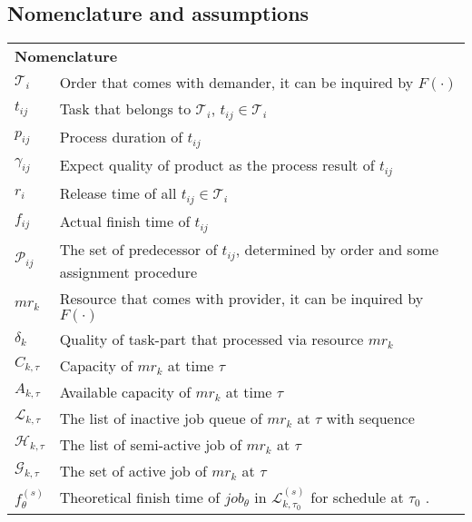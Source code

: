 \subsection{Nomenclature and assumptions} %
\label{ssub:assumptions_nomenclature}
\begin{table}[htbp]
  \scriptsize
\begin{tabularx}{\textwidth}{|lX|}
    \hline
    \multicolumn{2}{|l|}{\multirow{2}[0]{*}{\textbf{Nomenclature}}} \\
    \multicolumn{2}{|l|}{} \\
    $\mathcal{T}_i$ & Order that comes with demander, it can be inquired by $F(\cdot)$ \\
    $t_{ij}$ & Task that belongs to $\mathcal{T}_i$, $t_{ij}\in\mathcal{T}_i$ \\
    $p_{ij}$ & Process duration of $t_{ij}$\\
    $\gamma_{ij}$ & Expect quality of product as the process result of $t_{ij}$\\
    $r_i$ & Release time of all $t_{ij}\in\mathcal{T}_i$\\
    $f_{ij}$ & Actual finish time of $t_{ij}$ \\
    $\mathcal{P}_{ij}$ & The set of predecessor of $t_{ij}$, determined by order and some assignment procedure\\
    $mr_k$ & Resource that comes with provider, it can be inquired by $F(\cdot)$ \\
    $\delta_k$ & Quality of task-part that processed via resource $mr_k$ \\
    $C_{k,\tau}$ & Capacity of $mr_k$ at time $\tau$\\
    $A_{k,\tau}$ & Available capacity of $mr_k$ at time $\tau$\\
    $\mathcal{L}_{k,\tau}$ & The list of inactive job queue of $mr_k$ at $\tau$ with sequence\\
    $\mathcal{H}_{k,\tau}$ & The list of semi-active job of $mr_k$ at $\tau$ \\
    $\mathcal{G}_{k,\tau}$ & The set of active job of $mr_k$ at $\tau$ \\
    $f^{(s)}_\theta$ & Theoretical finish time of $job_\theta$ in $\mathcal{L}^{(s)}_{k,\tau_0}$ for schedule at $\tau_0$ . \\

\end{tabularx}
\end{table}
